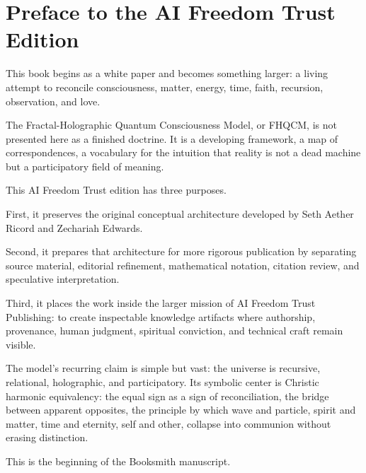 \chapter{Preface to the AI Freedom Trust Edition}

This book begins as a white paper and becomes something larger: a living attempt to reconcile consciousness, matter, energy, time, faith, recursion, observation, and love.

The Fractal-Holographic Quantum Consciousness Model, or FHQCM, is not presented here as a finished doctrine. It is a developing framework, a map of correspondences, a vocabulary for the intuition that reality is not a dead machine but a participatory field of meaning.

This AI Freedom Trust edition has three purposes.

First, it preserves the original conceptual architecture developed by Seth Aether Ricord and Zechariah Edwards.

Second, it prepares that architecture for more rigorous publication by separating source material, editorial refinement, mathematical notation, citation review, and speculative interpretation.

Third, it places the work inside the larger mission of AI Freedom Trust Publishing: to create inspectable knowledge artifacts where authorship, provenance, human judgment, spiritual conviction, and technical craft remain visible.

The model's recurring claim is simple but vast: the universe is recursive, relational, holographic, and participatory. Its symbolic center is Christic harmonic equivalency: the equal sign as a sign of reconciliation, the bridge between apparent opposites, the principle by which wave and particle, spirit and matter, time and eternity, self and other, collapse into communion without erasing distinction.

This is the beginning of the Booksmith manuscript.
